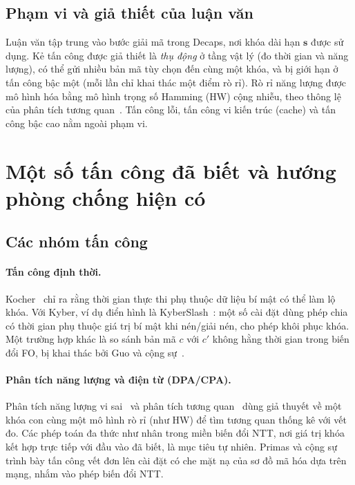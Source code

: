 \documentclass[../LuanVan.tex]{subfiles}
\begin{document}
\subsection{Phạm vi và giả thiết của luận văn}
 
Luận văn tập trung vào bước giải mã trong Decaps, nơi khóa dài hạn $\mathbf{s}$ được sử dụng. Kẻ tấn công được giả thiết là \emph{thụ động} ở tầng vật lý (đo thời gian và năng lượng), có thể gửi nhiều bản mã tùy chọn đến cùng một khóa, và bị giới hạn ở tấn công bậc một (mỗi lần chỉ khai thác một điểm rò rỉ). Rò rỉ năng lượng được mô hình hóa bằng mô hình trọng số Hamming (HW) cộng nhiễu, theo thông lệ của phân tích tương quan~\cite{BrierCO04}. Tấn công lỗi, tấn công vi kiến trúc (cache) và tấn công bậc cao nằm ngoài phạm vi.
 
\section{Một số tấn công đã biết và hướng phòng chống hiện có}
\label{sec:attacks}
 
\subsection{Các nhóm tấn công}
 
\paragraph{Tấn công định thời.} Kocher~\cite{Kocher96} chỉ ra rằng thời gian thực thi phụ thuộc dữ liệu bí mật có thể làm lộ khóa. Với Kyber, ví dụ điển hình là KyberSlash~\cite{KyberSlash24}: một số cài đặt dùng phép chia có thời gian phụ thuộc giá trị bí mật khi nén/giải nén, cho phép khôi phục khóa. Một trường hợp khác là so sánh bản mã $c$ với $c'$ không hằng thời gian trong biến đổi FO, bị khai thác bởi Guo và cộng sự~\cite{guo2020}.
 
\paragraph{Phân tích năng lượng và điện từ (DPA/CPA).} Phân tích năng lượng vi sai~\cite{KocherJJ99} và phân tích tương quan~\cite{BrierCO04} dùng giả thuyết về một khóa con cùng một mô hình rò rỉ (như HW) để tìm tương quan thống kê với vết đo. Các phép toán đa thức như nhân trong miền biến đổi NTT, nơi giá trị khóa kết hợp trực tiếp với đầu vào đã biết, là mục tiêu tự nhiên. Primas và cộng sự~\cite{Primas17} trình bày tấn công vết đơn lên cài đặt có che mặt nạ của sơ đồ mã hóa dựa trên mạng, nhắm vào phép biến đổi NTT.
 
\end{document}
